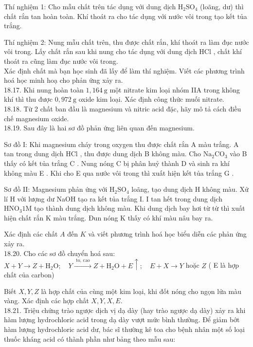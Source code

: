 \documentclass[10pt]{article}
\begin{document}
Thí nghiệm 1: Cho mẫu chất trên tác dụng với dung dịch $\mathrm{H}_{2} \mathrm{SO}_{4}$ (loãng, dư) thì chất rắn tan hoàn toàn. Khí thoát ra cho tác dụng với nước vôi trong tạo kết tủa trắng.

Thí nghiệm 2: Nung mẫu chất trên, thu được chất rắn, khí thoát ra làm đục nước vôi trong. Lấy chất rắn sau khi nung cho tác dụng với dung dịch HCl , chất khí thoát ra cũng làm đục nước vôi trong.\\
Xác định chất mà bạn học sinh đã lấy để làm thí nghiệm. Viết các phương trình hoá học minh hoạ cho phản ứng xảy ra.\\
18.17. Khi nung hoàn toàn $1,164 \mathrm{~g}$ một nitrate kim loại nhóm IIA trong không khí thì thu được $0,972 \mathrm{~g}$ oxide kim loại. Xác định công thức muối nitrate.\\
18.18. Từ 2 chất ban đầu là magnesium và nitric acid đặc, hãy mô tả cách điều chế magnesium oxide.\\
18.19. Sau đây là hai sơ đồ phản ứng liên quan đến magnesium.

Sơ đồ I: Khi magnesium cháy trong oxygen thu được chất rắn A màu trắng. A tan trong dung dịch HCl , thu được dung dịch B không màu. Cho $\mathrm{Na}_{2} \mathrm{CO}_{3}$ vào B thấy có kết tủa trắng C . Nung nóng C bị phân huỷ thành D và sinh ra khí không màu E . Khi cho E qua nước vôi trong thì xuất hiện kết tủa trắng G .

Sơ đồ II: Magnesium phản ứng với $\mathrm{H}_{2} \mathrm{SO}_{4}$ loãng, tạo dung dịch H không màu. Xử lí H với lượng dư NaOH tạo ra kết tủa trắng I. I tan hết trong dung dịch $\mathrm{HNO}_{3} 1 \mathrm{M}$ tạo thành dung dịch không màu. Khi dung dịch bay hơi từ từ thì xuất hiện chất rắn K màu trắng. Đun nóng K thấy có khí màu nâu bay ra.

Xác định các chất $A$ đến $K$ và viết phương trình hoá học biểu diễn các phản ứng xảy ra.\\
18.20. Cho các sơ đồ chuyển hoá sau:\\
$X+Y \rightarrow Z+\mathrm{H}_{2} \mathrm{O} ; \quad Y \xrightarrow{\text { to, cao }} Z+\mathrm{H}_{2} \mathrm{O}+E \uparrow ; \quad E+X \rightarrow Y$ hoặc $Z$ ( E là hợp chất của carbon)

Biết $X, Y, Z$ là hợp chất của cùng một kim loại, khi đốt nóng cho ngọn lửa màu vàng. Xác định các hợp chất $X, Y, X, E$.\\
18.21. Triệu chứng trào ngược dịch vị dạ dày (hay trào ngược dạ dày) xảy ra khi hàm lượng hydrochloric acid trong dạ dày vượt mức bình thường. Để giảm bớt hàm lượng hydrochloric acid dư, bác sĩ thường kê toa cho bệnh nhân một số loại thuốc kháng acid có thành phần như bảng theo mẫu sau:
\end{document}
